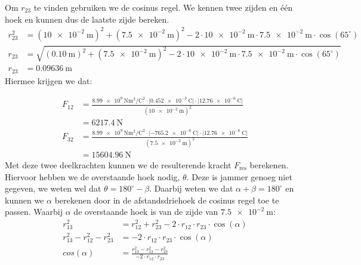 \begin{voorbeeld}
            Om $r_{23}$ te vinden gebruiken we de cosinus regel. We kennen twee zijden en één hoek en kunnen dus de laatste zijde bereken.
            \begin{align*}
            	r^{2}_{23} &= (\qty{10e-2}{\meter})^{2} + (\qty{7,5e-2}{\meter})^{2}-2\cdot \qty{10e-2}{\meter}\cdot \qty{7,5e-2}{\meter}\cdot \cos(65^\circ)\\
            	r_{23}&=\sqrt{(\qty{0,10}{\meter})^{2} + (\qty{7,5e-2}{\meter})^{2}-2\cdot \qty{10e-2}{\meter}\cdot \qty{7,5e-2}{\meter}\cdot \cos(65^\circ)}\\
            	r_{23}&= \qty{0,09636}{\meter}
            \end{align*}
            Hiermee krijgen we dat:
            
            \begin{align*}
            	F_{12} &= \frac{\qty{8,99e9}{\newton\meter\squared\per\coulomb\squared} \cdot \lvert \qty{0,452e-3}{\coulomb} \rvert \cdot\lvert \qty{12,76e-6}{\coulomb}\rvert}{(\qty{10e-2}{\meter})^{2}}\\
            	&=\qty{6217,4}{\newton}\\
            	F_{32} &= \frac{\qty{8,99e9}{\newton\meter\squared\per\coulomb\squared}\cdot \lvert \qty{-765,2e-6}{\coulomb}\rvert \cdot\lvert \qty{12,76e-6}{\coulomb}\rvert}{(\qty{7,5e-2}{\meter})^{2}}\\
            	&=\qty{15604,96}{\newton}
            \end{align*}	
            Met deze twee deelkrachten kunnen we de resulterende kracht $F_{\text{res}}$ berekenen. Hiervoor hebben we de overstaande hoek nodig, $\theta$. Deze is jammer genoeg niet gegeven, we weten wel dat $\theta = 180^\circ -\beta$. 
            \newline
            \newline
            Daarbij weten we dat $\alpha+\beta =180^\circ$  en kunnen we $\alpha$ berekenen door in de afstandsdriehoek de cosinus regel toe te passen. Waarbij $\alpha$ de overstaande hoek is van de zijde van $\qty{7,5e-2}{\meter}$:
            \begin{align*}
            	r^{2}_{13}&=r^{2}_{12}+r^{2}_{23}-2\cdot r_{12}\cdot r_{23}\cdot \cos(\alpha)\\
            	r^{2}_{13} - r^{2}_{12} -r^{2}_{23} &=-2\cdot r_{12}\cdot r_{23}\cdot \cos(\alpha)\\
            	cos(\alpha)&= \frac{r^{2}_{13} - r^{2}_{12} -r^{2}_{23}}{-2\cdot r_{12}\cdot r_{23}}\\

\end{align*}
\end{voorbeeld}

